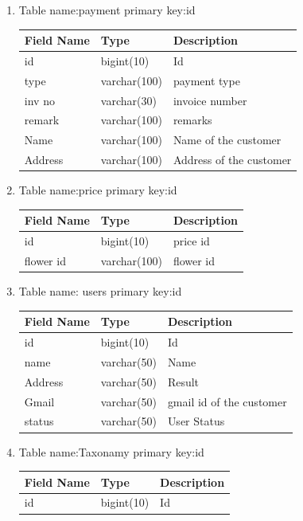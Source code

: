 \documentclass[a4paper,12pt]{article}
\begin{document}
\begin{enumerate}
\vspace{9mm}
\item  Table name:payment
\newline primary key:id
\vspace{9mm}\newline
\begin{tabular}{|l|l|l|} 
\hline
Field Name&Type&Description\\
 \hline 
id&bigint(10)&Id\\
\hline 
type&varchar(100)&payment type\\
\hline
inv no&varchar(30)&invoice number\\
\hline
remark&varchar(100)&remarks\\
\hline
Name&varchar(100)&Name of the customer\\
\hline
Address&varchar(100)&Address of the customer\\
\hline
 \end{tabular}
\newpage
\vspace{9mm}
\item  Table name:price
\newline primary key:id
\vspace{9mm}\newline
\begin{tabular}{|l|l|l|} 
\hline
Field Name&Type&Description\\
 \hline 
id&bigint(10)&price id\\
\hline 
flower id&varchar(100)&flower id\\

\hline
 \end{tabular}

\vspace{9mm}
\item  Table name: users
\newline primary key:id
\vspace{9mm}\newline
\begin{tabular}{|l|l|l|} 
\hline
Field Name&Type&Description\\
 \hline 

id&bigint(10)&Id\\ 
\hline name&varchar(50)&Name  \\
\hline
Address&varchar(50)&Result\\
\hline 
Gmail&varchar(50)&gmail id of the customer\\
\hline status&varchar(50)&User Status\\
\hline 
 \end{tabular}
\vspace{5mm}
\vspace{5mm}
\item  Table name:Taxonamy
\newline primary key:id 
\vspace{5mm}\newline
\begin{tabular}{|l|l|l|} 
\hline
Field Name&Type&Description\\
 \hline 
id&bigint(10)&Id\\


\end{tabular}
\end{enumerate}
\end{document}
